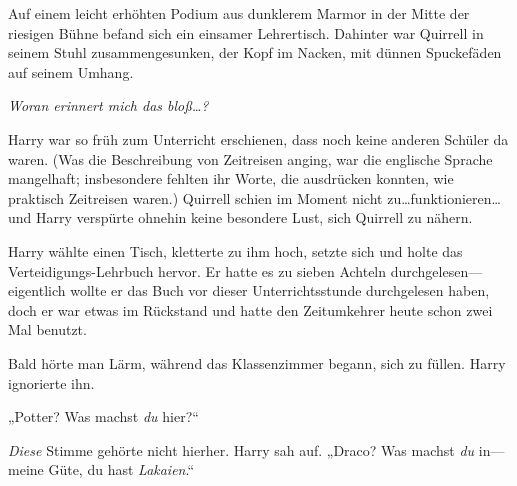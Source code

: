 Auf einem leicht erhöhten Podium aus dunklerem Marmor in der Mitte der riesigen Bühne befand sich ein einsamer Lehrertisch. Dahinter war Quirrell in seinem Stuhl zusammengesunken, der Kopf im Nacken, mit dünnen Spuckefäden auf seinem Umhang.

\emph{Woran erinnert mich das bloß…?}

Harry war so früh zum Unterricht erschienen, dass noch keine anderen Schüler da waren. (Was die Beschreibung von Zeitreisen anging, war die englische Sprache mangelhaft; insbesondere fehlten ihr Worte, die ausdrücken konnten, wie praktisch Zeitreisen waren.) Quirrell schien im Moment nicht zu…funktionieren…und Harry verspürte ohnehin keine besondere Lust, sich Quirrell zu nähern.

Harry wählte einen Tisch, kletterte zu ihm hoch, setzte sich und holte das Verteidigungs-Lehrbuch hervor. Er hatte es zu sieben Achteln durchgelesen—eigentlich wollte er das Buch vor dieser Unterrichtsstunde durchgelesen haben, doch er war etwas im Rückstand und hatte den Zeitumkehrer heute schon zwei Mal benutzt.

Bald hörte man Lärm, während das Klassenzimmer begann, sich zu füllen. Harry ignorierte ihn.

„Potter? Was machst \emph{du} hier?“

\emph{Diese} Stimme gehörte nicht hierher. Harry sah auf. „Draco? Was machst \emph{du} in—meine Güte, du hast \emph{Lakaien}.“

